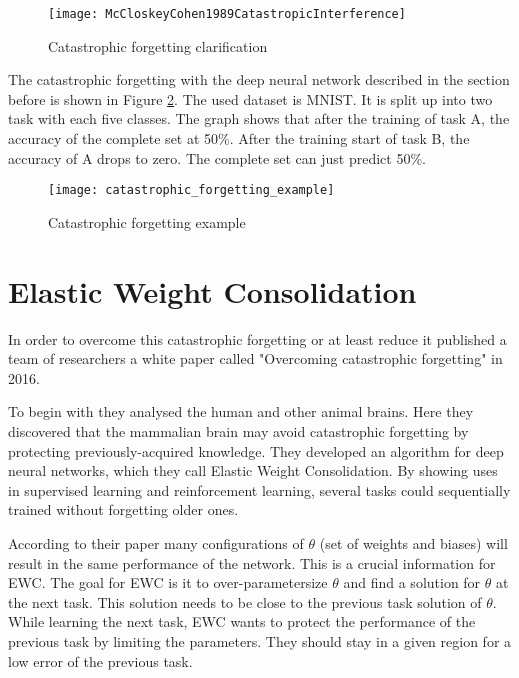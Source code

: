 \begin{figure}[H]
    \centering
    \texttt{[image: McCloskeyCohen1989CatastropicInterference]}
    \caption{\cite[page 148]{psychology_learning_mccloskey_cohen} Catastrophic forgetting clarification}
    \label{fig:catastrophic_forgetting_clarification}
\end{figure}

The catastrophic forgetting with the deep neural network described in the section before is shown in Figure \ref{fig:catastrophic_forgetting_example}.
The used dataset is MNIST.
It is split up into two task with each five classes.
The graph shows that after the training of task A, the accuracy of the complete set at 50\%.
After the training start of task B, the accuracy of A drops to zero.
The complete set can just predict 50\%.

\begin{figure}[H]
    \centering
    \texttt{[image: catastrophic\_forgetting\_example]}
    \caption{Catastrophic forgetting example}
    \label{fig:catastrophic_forgetting_example}
\end{figure}

\section{Elastic Weight Consolidation}
\label{foundation_ewc}

In order to overcome this catastrophic forgetting or at least reduce it published a team of researchers a white paper called "Overcoming catastrophic forgetting" in 2016.
\cite{elastic-weight-consolidation}

To begin with they analysed the human and other animal brains.
Here they discovered that the mammalian brain may avoid catastrophic forgetting by protecting previously-acquired knowledge.
They developed an algorithm for deep neural networks, which they call Elastic Weight Consolidation.
By showing uses in supervised learning and reinforcement learning, several tasks could sequentially trained without forgetting older ones.
\cite{elastic-weight-consolidation}

According to their paper many configurations of $\theta$ (set of weights and biases) will result in the same performance of the network.
This is a crucial information for EWC.
The goal for EWC is it to over-parametersize $\theta$ and find a solution for $\theta$ at the next task.
This solution needs to be close to the previous task solution of $\theta$.
While learning the next task, EWC wants to protect the performance of the previous task by limiting the parameters.
They should stay in a given region for a low error of the previous task.
\cite{elastic-weight-consolidation}

